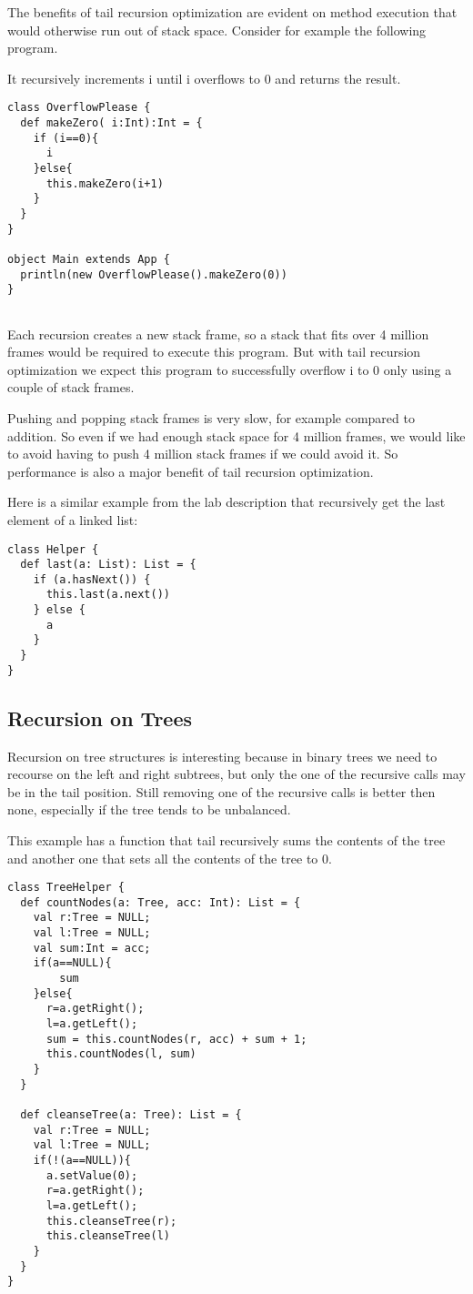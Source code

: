 The benefits of tail recursion optimization are evident on  method execution that would otherwise run out of stack space. Consider for example the following program.

It recursively increments i until i overflows to 0 and returns the result.
\begin{lstlisting}
class OverflowPlease {
  def makeZero( i:Int):Int = {
    if (i==0){
      i
    }else{
      this.makeZero(i+1)
    }
  }
}

object Main extends App {
  println(new OverflowPlease().makeZero(0))
}


\end{lstlisting}

Each recursion creates a new stack frame, so a stack that fits over 4 million frames would be required to execute this program. But with tail recursion optimization we expect this program to successfully overflow i to 0 only using a couple of stack frames.

Pushing and popping stack frames is very slow, for example compared to addition. So even if we had enough stack space for 4 million frames, we would like to avoid having to push 4 million stack frames if we could avoid it. So performance is also a major benefit of tail recursion optimization.


Here is a similar example from the lab description that recursively get the last element of a linked list:

\begin{lstlisting}
class Helper {
  def last(a: List): List = {
    if (a.hasNext()) {
      this.last(a.next())
    } else {
      a
    }
  }
}
\end{lstlisting}

\subsection{Recursion on Trees}

Recursion on tree structures is interesting because in binary trees we need to recourse on the left and right subtrees, but only the one of the recursive calls may be in the tail position. Still removing one of the recursive calls is better then none, especially if the tree tends to be unbalanced.

This example has a function that tail recursively sums the contents of the tree and another one that sets all the contents of the tree to 0.

\begin{lstlisting}
class TreeHelper {
  def countNodes(a: Tree, acc: Int): List = {
    val r:Tree = NULL;
    val l:Tree = NULL;
    val sum:Int = acc;
    if(a==NULL){
        sum
    }else{
      r=a.getRight();
      l=a.getLeft();
      sum = this.countNodes(r, acc) + sum + 1;
      this.countNodes(l, sum)
    }
  }
  
  def cleanseTree(a: Tree): List = {
    val r:Tree = NULL;
    val l:Tree = NULL;
    if(!(a==NULL)){
      a.setValue(0);
      r=a.getRight();
      l=a.getLeft();
      this.cleanseTree(r);
      this.cleanseTree(l)
    }
  }
}
\end{lstlisting}


